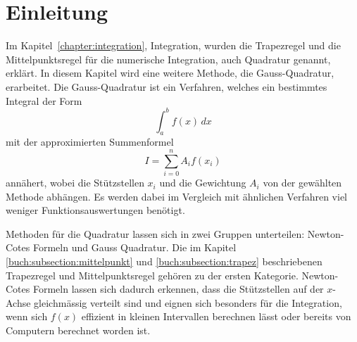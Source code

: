 %
%
%
\section{Einleitung\label{quadratur:section:einleitung}}

Im Kapitel~\ref{chapter:integration}, Integration, wurden die 
Trapezregel und die Mittelpunktsregel für die numerische Integration, 
auch Quadratur genannt, erklärt. 
In diesem Kapitel wird eine weitere Methode, die Gauss-Quadratur, erarbeitet.
Die Gauss-Quadratur ist ein Verfahren, welches ein bestimmtes Integral der Form
\begin{equation}
    \int_{a}^{b} f(x) \,dx
\end{equation}
mit der approximierten Summenformel
\begin{equation} \label{quadratur:equation:quadraturapproxsumme}
    I = \sum_{i=0}^{n} A_i f(x_i)
\end{equation}
annähert, wobei die Stützstellen $x_i$ und die Gewichtung $A_i$ von der gewählten 
Methode abhängen. 
Es werden dabei im Vergleich mit ähnlichen Verfahren viel weniger Funktionsauswertungen benötigt.

Methoden für die Quadratur lassen sich in zwei Gruppen unterteilen: 
Newton-Cotes Formeln und Gauss Quadratur.
Die im Kapitel \ref{buch:subsection:mittelpunkt} und \ref{buch:subsection:trapez} beschriebenen
Trapezregel und Mittelpunktsregel gehören zu der ersten Kategorie.
Newton-Cotes Formeln lassen sich dadurch erkennen, dass die Stützstellen auf der $x$-Achse 
gleichmässig verteilt sind und eignen sich besonders für die Integration, wenn sich $f(x)$ 
effizient in kleinen Intervallen berechnen lässt oder bereits von Computern berechnet worden ist.







